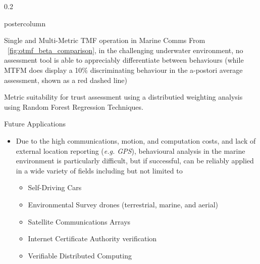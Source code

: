\documentclass[final,hyperref={pdfpagelabels=false}]{beamer}
\def\colwidth{0.2\linewidth}
\begin{document}
\begin{frame}[fragile]
\begin{columns}[T]
\begin{column}{\colwidth}
\begin{beamercolorbox}[center,wd=\textwidth]{postercolumn}
\begin{minipage}[T]{.98\textwidth}
{\begin{block}{Single and Multi-Metric TMF operation in Marine Comms}
                From ~\ref{fig:otmf_beta_comparison}, in the challenging underwater environment, no assessment tool is able to appreciably differentiate between behaviours (while MTFM does display a 10\% discriminating behaviour in the a-postori average assessment, shown as a red dashed line)

                                Metric suitability for trust assessment using a distributied weighting analysis using Random Forest Regression Techniques.



						\end{block}

						\begin{block}{Future Applications}
							\begin{itemize}
								\item Due to the high communications, motion, and computation costs, and lack of external location reporting (\emph{e.g. GPS}), 
								behavioural analysis in the marine environment is particularly difficult, but if successful, can be reliably applied in a wide 
								variety of fields including but not limited to
								\begin{itemize}
									\item Self-Driving Cars
									\item Environmental Survey drones (terrestrial, marine, and aerial)
									\item Satellite Communications Arrays
									\item Internet Certificate Authority verification
									\item Verifiable Distributed Computing
								\end{itemize}
							\end{itemize}              
						\end{block}
						
}
\end{minipage}
\end{beamercolorbox}
\end{column}
\end{columns}
\end{frame}
\end{document}
